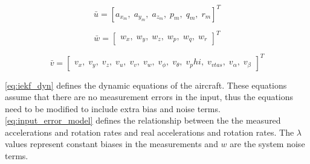 \begin{equation}
    \bar u = \left [ a_{x_m}, \; a_{y_m}, \; a_{z_m}, \; p_{m}, \; q_{m}, \; r_{m}\right ]^T
\end{equation}

\begin{equation}
    \bar w = \left[\begin{matrix}w_{x}, \; w_{y}, \; w_{z}, \; w_{p}, \; w_{q}, \; w_{r}\end{matrix}\right]^T
\end{equation}

\begin{equation}
\bar v = \left[\begin{matrix}v_{x}, \; v_{y}, \; v_{z}, \;  v_u, \; v_v, \; v_w, \; v_\phi, \; v_\theta, \; v_phi, \; v_{vtas}, \; v_\alpha, \; v_\beta \end{matrix}\right]^T
\end{equation}



\autoref{eq:iekf_dyn} defines the dynamic equations of the aircraft. These equations assume that there are no measurement errors in the input, thus the equations need to be modified to include extra bias and noise terms. \autoref{eq:input_error_model} defines the relationship between the the measured accelerations and rotation rates and real accelerations and rotation rates. The $\lambda$ values represent constant biases in the measurements and $w$ are the system noise terms. 

